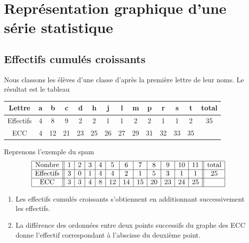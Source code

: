 \section{Représentation graphique d'une série statistique}

\subsection{Effectifs cumulés croissants}

Nous classons les élèves d'une classe d'après la première lettre de leur noms. Le résultat est le tableau
\begin{center}
\begin{tabular}[]{|c||c|c|c|c|c|c|c|c|c|c|c|c||c|}
        \hline
        Lettre&a&b&c&d&h&j&l&m&p&r&s&t&total\\
        \hline\hline
        Effectifs&4&8&9&2&2&1&1&2&2&1&1&2&35\\
        \hline
        ECC&4&12&21&23&25&26&27&29&31&32&33&35&\\
        \hline
\end{tabular}
\end{center}



Reprenons l'exemple du spam
\begin{equation*}
    \begin{array}[]{|c||c|c|c|c|c|c|c|c|c|c|c|| c |}
        \hline
        \text{Nombre}&1&2&3&4&5&6&7&8&9&10&11&\text{total}\\
        \hline
        \text{Effectifs}&3&0&1&4&4&2&1&5&3&1&1&25\\
        \hline
        \text{ECC}&3&3&4&8&12&14&15&20&23&24&25&\\
        \hline
    \end{array}
\end{equation*}

\begin{Aretenir}
    \begin{enumerate}
        \item
            Les effectifs cumulés croissants s'obtiennent en additionnant successivement les effectifs.
        \item
            La différence des ordonnées entre deux points successifs du graphe des ECC donne l'effectif correspondant à l'abscisse du deuxième point.
    \end{enumerate}
\end{Aretenir}

